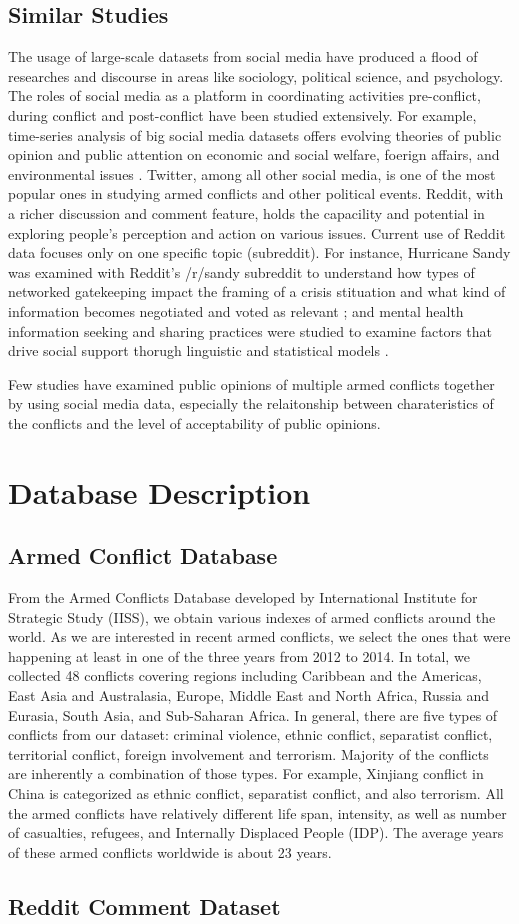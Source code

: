 \subsection{Similar Studies}
The usage of large-scale datasets from social media have produced a flood of researches and discourse in areas like sociology, political science, and psychology. The roles of social media as a platform in coordinating activities pre-conflict, during conflict and post-conflict have been studied extensively. For example, time-series analysis of big social media datasets offers evolving theories of public opinion and public attention on economic and social welfare, foerign affairs, and environmental issues \cite{RussellNeuman2014}. Twitter, among all other social media, is one of the most popular ones in studying armed conflicts and other political events. Reddit, with a richer discussion and comment feature, holds the capacility and potential in exploring people's perception and action on various issues. Current use of Reddit data focuses only on one specific topic (subreddit). For instance, Hurricane Sandy was examined with Reddit's /r/sandy subreddit to understand how types of networked gatekeeping impact the framing of a crisis stituation and what kind of information becomes negotiated and voted as relevant \cite{Leavitt}; and mental health information seeking and sharing practices were studied to examine factors that drive social support thorugh linguistic and statistical models \cite{dechoudhury2014mental}.

Few studies have examined public opinions of multiple armed conflicts together by using social media data, especially the relaitonship between charateristics of the conflicts and the level of acceptability of public opinions.

\section{Database Description}
\subsection{Armed Conflict Database}
From the Armed Conflicts Database developed by International Institute for Strategic Study (IISS), we obtain various indexes of armed conflicts around the world. As we are interested in recent armed conflicts, we select the ones that were happening at least in one of the three years from 2012 to 2014. In total, we collected 48 conflicts covering regions including Caribbean and the Americas, East Asia and Australasia, Europe, Middle East and North Africa, Russia and Eurasia, South Asia, and Sub-Saharan Africa. In general, there are five types of conflicts from our dataset: criminal violence, ethnic conflict, separatist conflict, territorial conflict, foreign involvement and terrorism. Majority of the conflicts are inherently a combination of those types. For example, Xinjiang conflict in China is categorized as ethnic conflict, separatist conflict, and also terrorism. All the armed conflicts have relatively different life span, intensity, as well as number of casualties, refugees, and Internally Displaced People (IDP). The average years of these armed conflicts worldwide is about 23 years.

\subsection{Reddit Comment Dataset}
